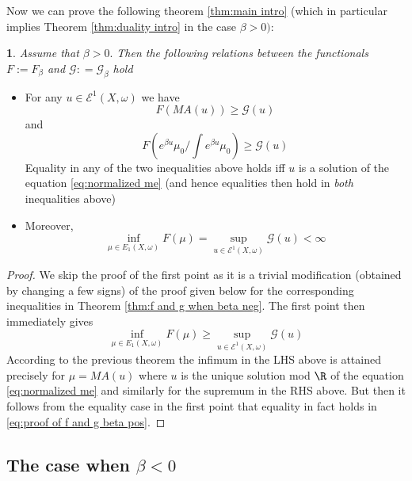 \documentclass[11pt,oneside,english]{amsart}
\numberwithin{equation}{section}
\numberwithin{figure}{section}
\theoremstyle{plain}
\newtheorem{thm}{\protect\theoremname}[section]
\theoremstyle{plain}
\theoremstyle{plain}
\theoremstyle{plain}
\theoremstyle{remark}
\theoremstyle{definition}
\providecommand{\theoremname}{Theorem}
\begin{document}
Now we can prove the following theorem \ref{thm:main intro} (which
in particular implies Theorem \ref{thm:duality intro} in the case
$\beta>0):$ 
\begin{thm}
\label{thm:relat f and g beta pos}Assume that $\beta>0.$ Then the
following relations between the functionals $F:=F_{\beta}$ and $\mathcal{G}:\mathcal{=}\mathcal{G}_{\beta}$
hold \end{thm}
\begin{itemize}
\item For any $u\in\mathcal{E}^{1}(X,\omega)$ we have 
\[
F(MA(u))\geq\mathcal{G}(u)
\]
 and 
\[
F(e^{\beta u}\mu_{0}/\int e^{\beta u}\mu_{0})\geq\mathcal{G}(u)
\]
 Equality in any of the two inequalities above holds iff $u$ is a
solution of the  equation \ref{eq:normalized me} (and hence equalities
then hold in \emph{both} inequalities above) 
\item Moreover, 
\[
\inf_{\mu\in E_{1}(X,\omega)}F(\mu)=\sup_{u\in\mathcal{E}^{1}(X,\omega)}\mathcal{G}(u)<\infty
\]
 \end{itemize}
\begin{proof}
We skip the proof of the first point as it is a trivial modification
(obtained by changing a few signs) of the proof given below for the
corresponding inequalities in Theorem \ref{thm:f and g when beta neg}.
The first point then immediately gives 
\begin{equation}
\inf_{\mu\in E_{1}(X,\omega)}F(\mu)\geq\sup_{u\in\mathcal{E}^{1}(X,\omega)}\mathcal{G}(u)\label{eq:proof of f and g beta pos}
\end{equation}
 According to the previous theorem the infimum in the LHS above is
attained precisely for $\mu=MA(u)$ where $u$ is the unique solution
mod $\R$ of the  equation \ref{eq:normalized me} and similarly for
the supremum in the RHS above. But then it follows from the equality
case in the first point that equality in fact holds in \ref{eq:proof of f and g beta pos}. 
\end{proof}

\subsection{The case when $\beta<0$}
\end{document}
